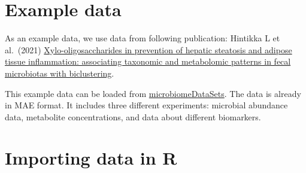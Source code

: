 \documentclass[
  oneside]{book}
\newenvironment{Shaded}{\begin{snugshade}}{\end{snugshade}}
\newcommand{\AttributeTok}[1]{\textcolor[rgb]{0.77,0.63,0.00}{#1}}
\newcommand{\CommentTok}[1]{\textcolor[rgb]{0.56,0.35,0.01}{\textit{#1}}}
\newcommand{\DecValTok}[1]{\textcolor[rgb]{0.00,0.00,0.81}{#1}}
\newcommand{\FunctionTok}[1]{\textcolor[rgb]{0.00,0.00,0.00}{#1}}
\newcommand{\NormalTok}[1]{#1}
\newcommand{\OtherTok}[1]{\textcolor[rgb]{0.56,0.35,0.01}{#1}}
\newcommand{\SpecialCharTok}[1]{\textcolor[rgb]{0.00,0.00,0.00}{#1}}
\newcommand{\StringTok}[1]{\textcolor[rgb]{0.31,0.60,0.02}{#1}}
\begin{document}
\hypertarget{example-data}{%
\section{Example data}\label{example-data}}

As an example data, we use data from following publication: Hintikka L et al.~(2021) \href{https://www.mdpi.com/1660-4601/18/8/4049}{Xylo-oligosaccharides in prevention of hepatic steatosis and adipose tissue inflammation: associating taxonomic and metabolomic patterns in fecal microbiotas with biclustering}.

This example data can be loaded from \href{https://bioconductor.org/packages/release/data/experiment/html/microbiomeDataSets.html}{microbiomeDataSets}. The data is already in MAE format. It includes three different experiments: microbial abundance data, metabolite concentrations, and data about different biomarkers.

\hypertarget{importing-data-in-r}{%
\section{Importing data in R}\label{importing-data-in-r}}

\begin{Shaded}
\end{Shaded}
\end{document}
